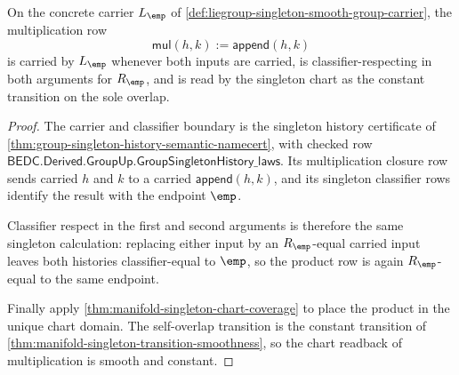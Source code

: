 \begin{theorem}
\label{thm:liegroup-singleton-multiplication-smooth-homomorphism}
On the concrete carrier $L_{\emp}$ of
\autoref{def:liegroup-singleton-smooth-group-carrier}, the multiplication row
$$
\mathsf{mul}(h,k):=\mathsf{append}(h,k)
$$
is carried by $L_{\emp}$ whenever both inputs are carried, is
classifier-respecting in both arguments for $R_{\emp}$, and is read by the
singleton chart as the constant transition on the sole overlap.
\end{theorem}
\begin{proof}
The carrier and classifier boundary is the singleton history certificate of
\autoref{thm:group-singleton-history-semantic-namecert}, with checked row
$\mathsf{BEDC.Derived.GroupUp.GroupSingletonHistory\_laws}$. Its multiplication
closure row sends carried $h$ and $k$ to a carried
$\mathsf{append}(h,k)$, and its singleton classifier rows identify the result
with the endpoint $\emp$.

Classifier respect in the first and second arguments is therefore the same
singleton calculation: replacing either input by an $R_{\emp}$-equal carried
input leaves both histories classifier-equal to $\emp$, so the product row is
again $R_{\emp}$-equal to the same endpoint.

Finally apply \autoref{thm:manifold-singleton-chart-coverage} to place the
product in the unique chart domain. The self-overlap transition is the constant
transition of \autoref{thm:manifold-singleton-transition-smoothness}, so the
chart readback of multiplication is smooth and constant.
\end{proof}

